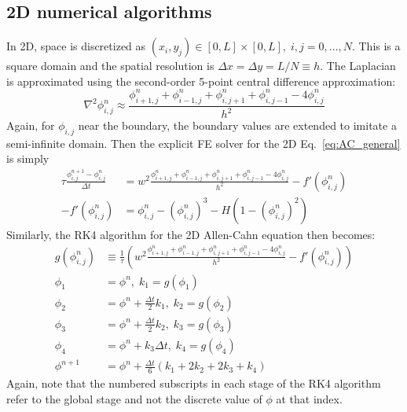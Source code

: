 \documentclass[12pt]{article}
\newcommand{\refeq}[1]{Eq.~\eqref{#1}}
\newcommand{\dx}{\Delta x}
\newcommand{\dy}{\Delta y}
\newcommand{\dt}{\Delta t}
\begin{document}
\subsection{2D numerical algorithms}
In 2D, space is discretized as $(x_i, y_j) \in [0, L] \times [0, L],\; i, j = 0, \dots, N$.
This is a square domain and the spatial resolution is $\dx = \dy = L/N \equiv h$.
The Laplacian is approximated using the second-order 5-point central difference approximation:
\begin{equation}
    \nabla^2 \phi_{i,j}^n \approx \frac{\phi_{i+1, j}^n + \phi_{i-1, j}^n + \phi_{i, j+1}^n + \phi_{i, j-1}^n - 4\phi_{i,j}^n}{h^2}
\end{equation}
Again, for $\phi_{i,j}$ near the boundary, the boundary values are extended to imitate a semi-infinite domain.
Then the explicit FE solver for the 2D \refeq{eq:AC_general} is simply
\begin{align}
    \tau \frac{\phi_{i,j}^{n+1} - \phi_{i,j}^n}{\dt} &= w^2 \frac{\phi_{i+1, j}^n + \phi_{i-1, j}^n + \phi_{i, j+1}^n + \phi_{i, j-1}^n - 4\phi_{i,j}^n}{h^2} - f'(\phi_{i,j}^n)  \label{eq:2d_fe} \\
    -f'(\phi_{i,j}^n) &= \phi_{i,j}^n - (\phi_{i,j}^n)^3 - H(1 - (\phi_{i,j}^n)^2)
\end{align}
Similarly, the RK4 algorithm for the 2D Allen-Cahn equation then becomes:
\begin{align}
    g(\phi_{i,j}^n) &\equiv \frac{1}{\tau}\left(w^2 \frac{\phi_{i+1, j}^n + \phi_{i-1, j}^n + \phi_{i, j+1}^n + \phi_{i, j-1}^n - 4\phi_{i,j}^n}{h^2} - f'(\phi_{i,j}^n)\right) \nonumber \\
    \phi_1 &= \phi^n, \; k_1 = g(\phi_1) \nonumber \\
    \phi_2 &= \phi^n + \frac{\dt}{2}k_1, \; k_2 = g(\phi_2) \nonumber \\
    \phi_3 &= \phi^n + \frac{\dt}{2}k_2, \; k_3 = g(\phi_3) \nonumber \\
    \phi_4 &= \phi^n + k_3 \dt, \; k_4 = g(\phi_4) \nonumber \\
    \phi^{n+1} &= \phi^n + \frac{\dt}{6}\left(k_1 + 2k_2 + 2k_3 + k_4\right) \label{eq:2d_rk4}
\end{align}
Again, note that the numbered subscripts in each stage of the RK4 algorithm refer to the global stage and not the discrete value of $\phi$ at that index.
\end{document}
